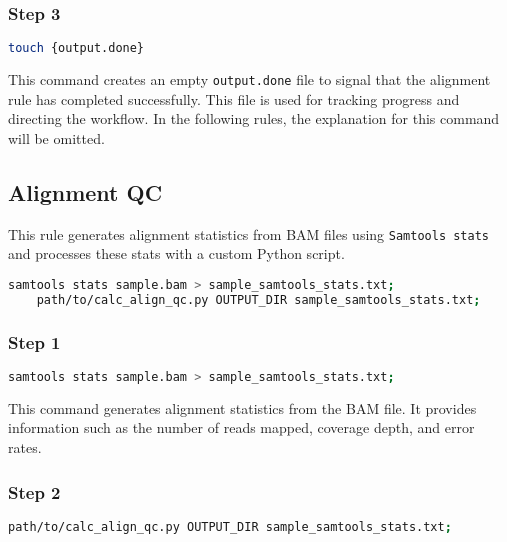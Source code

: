 \subsubsection*{Step 3}

\begin{lstlisting}[breaklines=true, language=bash]
    touch {output.done}
\end{lstlisting}

This command creates an empty \texttt{output.done} file to signal that the alignment rule has completed successfully. This file is used for tracking progress and directing the workflow. In the following rules, the explanation for this command will be omitted.

\subsection{Alignment QC}

This rule generates alignment statistics from BAM files using \texttt{Samtools stats} and processes these stats with a custom Python script.

\begin{lstlisting}[breaklines=true, language=bash]
    samtools stats sample.bam > sample_samtools_stats.txt;
    path/to/calc_align_qc.py OUTPUT_DIR sample_samtools_stats.txt;
\end{lstlisting}

\subsubsection*{Step 1}

\begin{lstlisting}[breaklines=true, language=bash]
    samtools stats sample.bam > sample_samtools_stats.txt;
\end{lstlisting}

This command generates alignment statistics from the BAM file. It provides information such as the number of reads mapped, coverage depth, and error rates.

\subsubsection*{Step 2}

\begin{lstlisting}[breaklines=true, language=bash]
    path/to/calc_align_qc.py OUTPUT_DIR sample_samtools_stats.txt;
\end{lstlisting}

